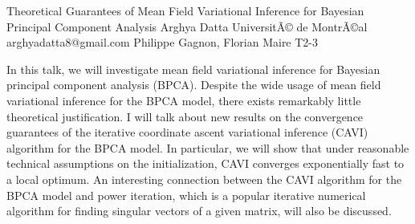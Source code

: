 \begin{talk}
  {Theoretical Guarantees of Mean Field Variational Inference for Bayesian Principal Component Analysis}%
  {Arghya Datta}%
  {UniversitÃ© de MontrÃ©al}%
  {arghyadatta8@gmail.com}%
  {Philippe Gagnon, Florian Maire}%
  {T2-3}%
			
In this talk, we will investigate mean field variational inference for Bayesian principal component analysis (BPCA). Despite the wide usage of mean field variational inference for the BPCA model, there exists remarkably little theoretical justification. I will talk about new results on the convergence guarantees of the iterative coordinate ascent variational inference (CAVI) algorithm for the BPCA model. In particular, we will show that under reasonable technical assumptions on the initialization, CAVI converges exponentially fast to a local optimum. An interesting connection between the CAVI algorithm for the BPCA model and power iteration, which is a popular iterative numerical algorithm for finding singular vectors of a given matrix, will also be discussed.


\end{talk}

